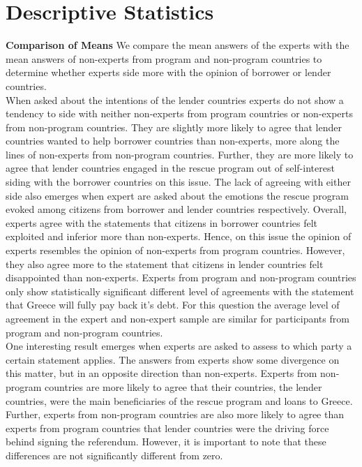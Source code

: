 \documentclass[12pt]{article}
\begin{document}
\section{Descriptive Statistics}

\textbf{Comparison of Means}
We compare the mean answers of the experts with the mean answers of non-experts from program and non-program countries to determine whether experts side more with the opinion of borrower or lender countries.\\
When asked about the intentions of the lender countries experts do not show a tendency to side with neither non-experts from program countries or non-experts from non-program countries. They are slightly more likely to agree that lender countries wanted to help borrower countries than non-experts, more along the lines of non-experts from non-program countries. Further, they are more likely to agree that lender countries engaged in the rescue program out of self-interest siding with the borrower countries on this issue. The lack of agreeing with either side also emerges when expert are asked about the emotions the rescue program evoked among citizens from borrower and lender countries respectively. Overall, experts agree with the statements that citizens in borrower countries felt exploited and inferior more than non-experts. Hence, on this issue the opinion of experts resembles the opinion of non-experts from program countries. However, they also agree more to the statement that citizens in lender countries felt disappointed than non-experts. Experts from program and non-program countries only show statistically significant different level of agreements with the statement that Greece will fully pay back it's debt. For this question the average level of agreement in the expert and non-expert sample are similar for participants from program and non-program countries. \\
One interesting result emerges when experts are asked to assess to which party a certain statement applies. The answers from experts show some divergence on this matter, but in an opposite direction than non-experts. Experts from non-program countries are more likely to agree that their countries, the lender countries, were the main beneficiaries of the rescue program and loans to Greece. Further, experts from non-program countries are also more likely to agree than experts from program countries that lender countries were the driving force behind signing the referendum. However, it is important to note that these differences are not significantly different from zero.  \\
\end{document}
